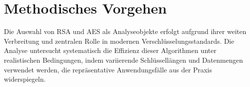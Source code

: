 
\section{Methodisches Vorgehen}
Die Auswahl von RSA und AES als Analyseobjekte erfolgt aufgrund ihrer weiten Verbreitung und zentralen Rolle in modernen 
Verschlüsselungsstandards. Die Analyse untersucht systematisch die Effizienz dieser Algorithmen unter realistischen Bedingungen, 
indem variierende Schlüssellängen und Datenmengen verwendet werden, die repräsentative Anwendungsfälle aus der Praxis widerspiegeln.

